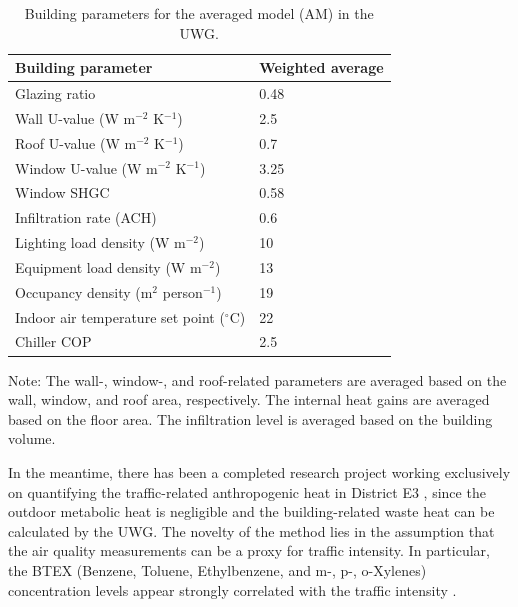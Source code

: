 \begin{table}[]
\footnotesize
\begin{center}
\caption{Building parameters for the averaged model (AM) in the UWG.}
\label{my-label}
\begin{tabular}{ll}
\toprule
Building parameter                    & Weighted average \\ \hline
Glazing ratio                         & 0.48             \\
Wall U-value (W m$^{-2}$ K$^{-1}$)              & 2.5              \\
Roof U-value (W m$^{-2}$ K$^{-1}$)              & 0.7              \\
Window U-value (W m$^{-2}$ K$^{-1}$)            & 3.25             \\
Window SHGC                           & 0.58             \\
Infiltration rate (ACH)               & 0.6              \\
Lighting load density (W m$^{-2}$)         & 10               \\
Equipment load density (W m$^{-2}$)        & 13               \\
Occupancy density (m$^2$ person$^{-1}$)       & 19               \\
Indoor air temperature set point ($^{\circ}$C) & 22               \\
Chiller COP                           & 2.5              \\
\bottomrule
\end{tabular}
\end{center}
Note: The wall-, window-, and roof-related parameters are averaged based on the wall, window, and roof area, respectively. The internal heat gains are averaged based on the floor area. The infiltration level is averaged based on the building volume.
\end{table}

In the meantime, there has been a completed research project working exclusively on quantifying the traffic-related anthropogenic heat in District E3 \cite{afshari2017estimation}, since the outdoor metabolic heat is negligible and the building-related waste heat can be calculated by the UWG. The novelty of the method lies in the assumption that the air quality measurements can be a proxy for traffic intensity. In particular, the BTEX (Benzene, Toluene, Ethylbenzene, and m-, p-, o-Xylenes) concentration levels appear strongly correlated with the traffic intensity \cite{afshari2017estimation}.

